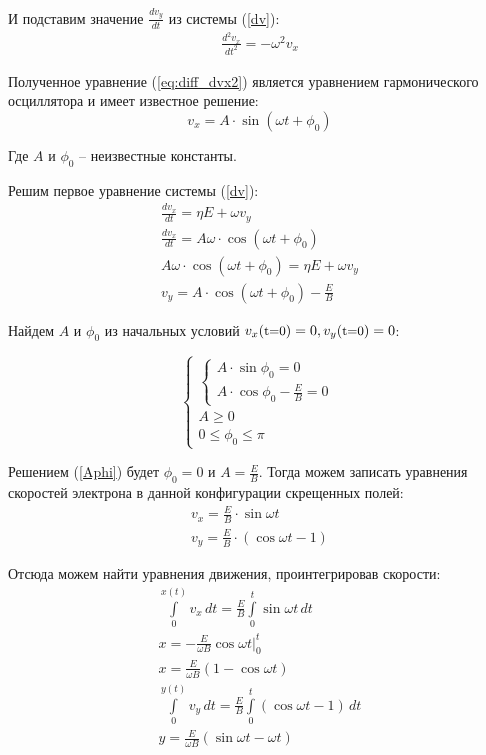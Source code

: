 И подставим значение $\frac{dv_y}{dt}$ из системы (\ref{dv}):%
\begin{gather}
	\label{eq:diff_dvx2}
	\frac{d^2v_x}{dt^2}=-\omega^2{}v_x
\end{gather}

Полученное уравнение (\ref{eq:diff_dvx2}) является уравнением гармонического осциллятора и имеет известное решение:%
\begin{equation}
	v_x=A\cdot\sin{(\omega{t}+\phi_0)}
\end{equation}

Где $A$ и $\phi_0$ -- неизвестные константы.

Решим первое уравнение системы (\ref{dv}): 
\begin{gather}
	\frac{dv_x}{dt}=\eta{}E+\omega{}v_y\\
	\frac{dv_x}{dt}=A\omega\cdot\cos{(\omega{t}+\phi_0)}\\
	A\omega\cdot\cos{(\omega{t}+\phi_0)}=\eta{}E+\omega{}v_y\\
	v_y=A\cdot\cos{(\omega{t}+\phi_0)}-\frac{E}{B}
\end{gather}

Найдем $A$ и $\phi_0$ из начальных условий $v_x({\text{\small t=0}})=0, v_y({\text{\small t=0}})=0$:

\begin{equation}
\label{Aphi}
 \begin{cases}
    \begin{cases}
   		A\cdot\sin{\phi_0}=0\\
   		A\cdot\cos{\phi_0}-\frac{E}{B}=0
 	\end{cases}\\
 	A\geq0\\
 	0\leq\phi_0\leq\pi
 \end{cases}
\end{equation}

Решением (\ref{Aphi}) будет $\phi_0=0$ и $A=\frac{E}{B}$. Тогда можем записать уравнения скоростей электрона в данной конфигурации скрещенных полей:
\begin{gather}
	\label{eq:v_t}
	v_x=\frac{E}{B}\cdot\sin{\omega{t}}\\
	v_y=\frac{E}{B}\cdot(\cos{\omega{t}}-1)
\end{gather}

Отсюда можем найти уравнения движения, проинтегрировав скорости:
\begin{gather}
	\label{eq:v_t}
	\int\limits_0^{x(t)}v_x\,dt=\frac{E}{B}\int\limits_0^{t}\sin{\omega{t}}\,dt\\
	x=-\frac{E}{\omega{B}}\cos{\omega{t}}\bigg|_0^t\\
	x=\frac{E}{\omega{B}}(1-\cos{\omega{t}})\\
	\int\limits_0^{y(t)}v_y\,dt=\frac{E}{B}\int\limits_0^{t}(\cos{\omega{t}}-1)\,dt\\
	y=\frac{E}{\omega{B}}(\sin{\omega{t}}-\omega{t})
\end{gather}

